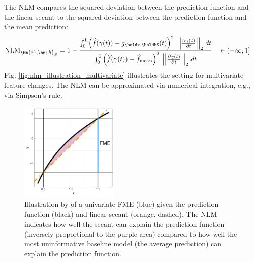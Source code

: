 The NLM compares the squared deviation between the prediction function and the linear secant to the squared deviation between the prediction function and the mean prediction:
\begin{align*}
    \text{NLM}_{\bm{x}, \bm{h}_S} &= 1 - \frac{\int_0^1 \left(\widehat{f}(\gamma(t)) - g_{\boldx, \boldhS}(t)\right)^2 \; \Big\vert \Big\vert \frac{\partial \gamma(t)}{\partial t}\Big\vert \Big\vert_2 \;dt}{\int_0^1 \left(\widehat{f}(\gamma(t)) - \widehat{f}_{\text{mean}} \right)^2 \; \Big\vert \Big\vert \frac{\partial \gamma(t)}{\partial t}\Big\vert \Big\vert_2 \;dt} \quad
    \in (-\infty, 1]
\end{align*}
Fig. \ref{fig:nlm_illustration_multivariate} illustrates the setting for multivariate feature changes. The NLM can be approximated via numerical integration, e.g., via Simpson's rule.

\begin{figure}[H]
    \centering
    \includegraphics[width = 0.42\textwidth]{figures/forward_me_deviation.pdf}
    \caption{Illustration by \citet{scholbeck_fme} of a univariate FME (blue) given the prediction function (black) and linear secant (orange, dashed). The NLM indicates how well the secant can explain the prediction function (inversely proportional to the purple area) compared to how well the most uninformative baseline model (the average prediction) can explain the prediction function.}
    \label{fig:nlm_illustration}
\end{figure}


